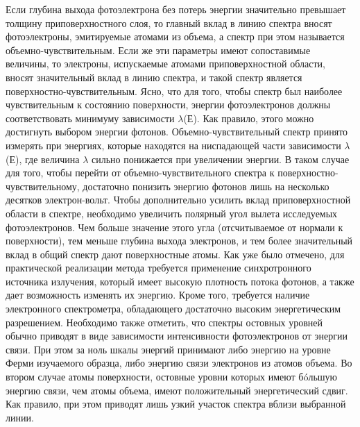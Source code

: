 Если глубина выхода фотоэлектрона без потерь энергии значительно превышает толщину приповерхностного слоя, то главный вклад в линию спектра вносят фотоэлектроны, эмитируемые атомами из объема, а спектр при этом называется объемно-чувствительным. Если же эти параметры имеют сопоставимые величины, то электроны, испускаемые атомами приповерхностной области, вносят значительный вклад в линию спектра, и такой спектр является поверхностно-чувствительным. Ясно, что для того, чтобы спектр был наиболее чувствительным к состоянию поверхности, энергии фотоэлектронов должны соответствовать минимуму зависимости $\lambda$(Е). Как правило, этого можно достигнуть выбором энергии фотонов. Объемно-чувствительный спектр принято измерять при энергиях, которые находятся на ниспадающей части зависимости $\lambda$(Е), где величина $\lambda$ сильно понижается при увеличении энергии. В таком случае для того, чтобы перейти от объемно-чувствительного спектра к поверхностно-чувствительному, достаточно понизить энергию фотонов лишь на несколько десятков электрон-вольт. Чтобы дополнительно усилить вклад приповерхностной области в спектре, необходимо увеличить полярный угол вылета исследуемых фотоэлектронов. Чем больше значение этого угла (отсчитываемое от нормали к поверхности), тем меньше глубина выхода электронов, и тем более значительный вклад в общий спектр дают поверхностные атомы. 
Как уже было отмечено, для практической реализации метода требуется применение синхротронного источника излучения, который имеет высокую плотность потока фотонов, а также дает возможность изменять их энергию. Кроме того, требуется наличие электронного спектрометра, обладающего достаточно высоким энергетическим разрешением.
Необходимо также отметить, что спектры остовных уровней обычно приводят в виде зависимости интенсивности фотоэлектронов от энергии связи. При этом за ноль шкалы энергий принимают либо энергию на уровне Ферми изучаемого образца, либо энергию связи электронов из атомов объема. Во втором случае атомы поверхности, остовные уровни которых имеют бóльшую энергию связи, чем атомы объема, имеют положительный энергетический сдвиг. Как правило, при этом приводят лишь узкий участок спектра вблизи выбранной линии.

